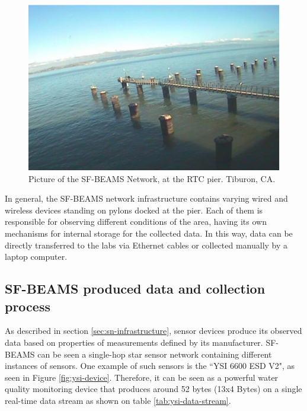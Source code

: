 \begin{figure}[!b]
  \centering
    \includegraphics[scale=0.7]{../diagrams/cam_image-oct15}
  \caption{Picture of the SF-BEAMS Network, at the RTC pier. Tiburon, CA.}
  \label{fig:sf-beams}
\end{figure}

In general, the SF-BEAMS network infrastructure contains varying wired and
wireless devices standing on pylons docked at the pier. Each of them is
responsible for observing different conditions of the area, having its own
mechanisms for internal storage for the collected data. In this way, data can
be directly transferred to the labs via Ethernet cables or collected manually
by a laptop computer.

\subsection{SF-BEAMS produced data and collection process}
\label{sec:sfbeams}

As described in section \ref{sec:sn-infrastructure}, sensor devices produce
its observed data based on properties of measurements defined by its
manufacturer. SF-BEAMS can be seen a single-hop star sensor network containing
different instances of sensors. One example of such sensors is the ``YSI 6600
ESD V2", as seen in Figure \ref{fig:ysi-device}. Therefore, it can be seen as
a powerful water quality monitoring device that produces around 52 bytes (13x4
Bytes) on a single real-time data stream as shown on table
\ref{tab:ysi-data-stream}.

